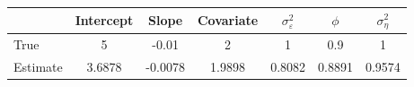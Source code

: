 \begin{tabular}{lcccccc}
\toprule
& Intercept & Slope & Covariate & $\sigma_\varepsilon^2$ & $\phi$ & $\sigma_\eta^2$ \\
\midrule
True & 5 & -0.01 & 2 & 1 & 0.9 & 1 \\
Estimate & 3.6878 & -0.0078 & 1.9898 & 0.8082 & 0.8891 & 0.9574 \\
\bottomrule
\end{tabular}

